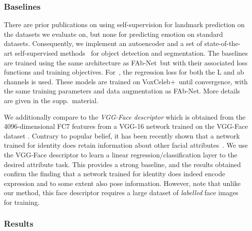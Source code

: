 \documentclass{bmvc2k}
\def\networkname{FAb-Net}
\def\voxcombiname{VoxCeleb+}
\begin{document}
\subsubsection{Baselines}
There are prior publications on using self-supervision for landmark prediction on the datasets
we evaluate on, but none for predicting emotion on standard datasets.
Consequently, we implement an autoencoder and a set of state-of-the-art self-supervised methods~\cite{gidaris2018unsupervised,zhang2017split} for object detection and segmentation.
The baselines are trained using the same architecture as \networkname~but with their associated loss functions and training objectives.
For~\cite{zhang2017split}, the regression loss for both the L and ab channels is used.
These models are trained on \voxcombiname~until convergence, with the same training parameters and data augmentation as \networkname. More details are given in the supp.\ material.

We additionally compare to the {\em VGG-Face descriptor} which is obtained
from the 4096-dimensional FC7 features from a VGG-16 network trained on
the VGG-Face dataset \cite{Parkhi15}. 
Contrary to popular belief, it
has been recently shown that a network trained for 
identity does retain information about other facial attributes~\cite{colesynthesizing,ephrat2018looking}. We
use the VGG-Face descriptor to learn a linear
regression/classification layer to the desired attribute task.  This
provides a strong baseline, and the results obtained confirm the
finding that a network trained for identity does indeed encode
expression and to some extent also pose information.  However, note that unlike our
method, this face descriptor requires a large dataset of {\em
labelled} face images for training.


\subsubsection{Results}
\end{document}

